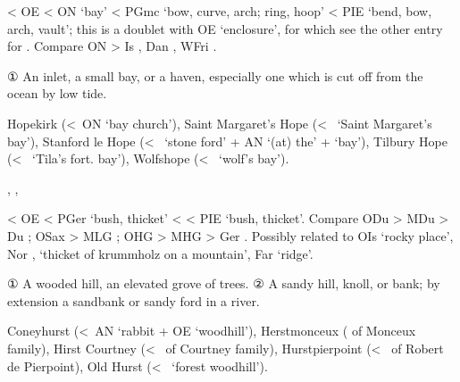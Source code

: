 \documentclass[12pt,letterpaper,oneside,article,draft]{memoir}
\begin{document}
\begin{Lemma}
\begin{Etymology}
	< OE  < ON  ‘bay’ < PGmc  ‘bow, curve, arch; ring, hoop’
		< PIE  ‘bend, bow, arch, vault’;
		this is a doublet with OE  ‘enclosure’, for which see the other entry for .
	Compare
	ON  > Is , Dan , WFri .
\end{Etymology}
\begin{Definitions}
	① An inlet, a small bay, or a haven, especially one which is cut off from the ocean by low tide.
\end{Definitions}
\begin{Examples}
	Hopekirk (<~ON  ‘bay church’), Saint Margaret’s Hope (<~ ‘Saint Margaret’s bay’), Stanford le Hope (<~ ‘stone ford’ + AN  ‘(at) the’ +  ‘bay’), Tilbury Hope (<~ ‘Tila’s fort. bay’), Wolfshope (<~ ‘wolf’s bay’).
\end{Examples}
\end{Lemma}

\begin{Lemma}
\begin{Also}
	, , 
\end{Also}
\begin{Etymology}
	< OE  < PGer  ‘bush, thicket’ <  < PIE  ‘bush, thicket’.
	Compare
	ODu  > MDu  > Du ;
	OSax  > MLG ;
	OHG  > MHG  > Ger .
	Possibly related to OIs  ‘rocky place’,
		Nor ,  ‘thicket of krummholz on a mountain’, Far  ‘ridge’.
\end{Etymology}
\begin{Definitions}
	① A wooded hill, an elevated grove of trees.
	② A sandy hill, knoll, or bank; by extension a sandbank or sandy ford in a river.
\end{Definitions}
\begin{Examples}
	Coneyhurst (<~AN  ‘rabbit + OE  ‘woodhill’), Herstmonceux ( of Monceux family), Hirst Courtney (<~ of Courtney family), Hurstpierpoint (<~ of Robert de Pierpoint), Old Hurst (<~ ‘forest woodhill’).
\end{Examples}
\end{Lemma}
\end{document}

